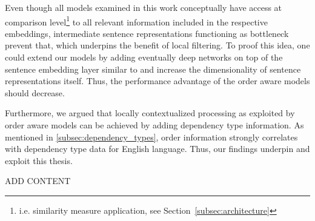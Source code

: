 
Even though all models examined in this work conceptually have access at comparison level\footnote{i.e. similarity measure application, see Section~\ref{subsec:architecture}} to all relevant information included in the respective embeddings, intermediate sentence representations functioning as bottleneck prevent that, which underpins the benefit of local filtering. To proof this idea, one could extend our models by adding eventually deep networks on top of the sentence embedding layer similar to \textcite{iyyer_deep_2015} and increase the dimensionality of sentence representations itself. Thus, the performance advantage of the order aware models should decrease.

Furthermore, we argued that locally contextualized processing as exploited  by order aware models can be achieved by adding dependency type information. As mentioned in \ref{subsec:dependency_types}, order information strongly correlates with dependency type data for English language. Thus, our findings underpin and exploit this thesis.



ADD CONTENT








